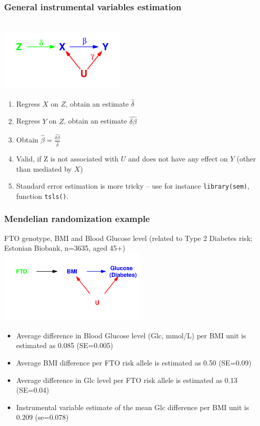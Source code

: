 \documentclass{beamer}
\newcommand{\code}[1]{\texttt{#1}}
\begin{document}
\begin{frame}
 \frametitle{General instrumental variables estimation}
\mbox{ }\\[-1cm]
\includegraphics[width=6cm]{instvar}\\
\begin{enumerate}
\item Regress $X$ on $Z$, obtain an estimate $\hat{\delta}$
\item Regress $Y$ on $Z$, obtain an estimate $\hat{\delta\beta}$ 
\item Obtain $\hat{\beta} = \frac{\hat{\delta\beta}}{\hat{\delta}}$
\item \alert{Valid, if Z is not associated with $U$ and does not have any effect on $Y$ (other than mediated by $X$)} 
\small
\item Standard error estimation is more tricky -- use for instance \code{library(sem)}, function \code{tsls()}.
\end{enumerate}
\normalsize
\end{frame}
\begin{frame}
 \frametitle{Mendelian randomization example}
 FTO genotype, BMI and Blood Glucose level (related to Type 2 Diabetes risk; Estonian Biobank, n=3635, aged 45+)
\mbox{ }\\[-0.5cm]
\includegraphics[width=7cm]{mendrand}\\[-0.5cm]
\begin{itemize}
\item Average difference in Blood Glucose level (Glc, mmol/L) per BMI unit is estimated as 0.085 (SE=0.005)
\item Average BMI difference per FTO risk allele is estimated as 0.50 (SE=0.09)
\item Average difference in Glc level per  FTO risk allele is estimated as 0.13 (SE=0.04)
\item \alert{ Instrumental variable estimate of the mean Glc difference per BMI unit is 0.209 (se=0.078)}
\end{itemize}
\end{frame}
\end{document}
